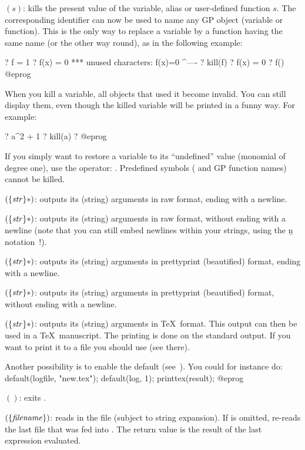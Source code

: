 $(s)$:\label{se:kill} kills the present value of the
variable, alias or user-defined function $s$. The corresponding identifier
can now be used to name any GP object (variable or function). This is the
only way to replace a variable by a function having the same name (or the
other way round), as in the following example:

\bprog
? f = 1
? f(x) = 0
  ***   unused characters: f(x)=0
                            ^----
? kill(f)
? f(x) = 0
? f()
@eprog

  When you kill a variable, all objects that used it become invalid. You
can still display them, even though the killed variable will be printed in a
funny way. For example:

\bprog
? a^2 + 1
? kill(a)
? %
@eprog

If you simply want to restore a variable to its ``undefined'' value
(monomial of degree one), use the  operator: .
Predefined symbols ( and GP function names) cannot be killed.

$(\{\hbox{\it str\/}\}*)$: outputs its (string) arguments in raw
format, ending with a newline.

$(\{\hbox{\it str\/}\}*)$: outputs its (string) arguments in raw
format, without ending with a newline (note that you can still embed newlines
within your strings, using the \b{n} notation~!).

$(\{\hbox{\it str\/}\}*)$: outputs its (string) arguments in
prettyprint (beautified) format, ending with a newline.

$(\{\hbox{\it str\/}\}*)$: outputs its (string) arguments in
prettyprint (beautified) format, without ending with a newline.

$(\{\hbox{\it str\/}\}*)$: outputs its (string) arguments in
\TeX\ format. This output can then be used in a \TeX\ manuscript.
The printing is done on the standard output. If you want to print it to a
file you should use  (see there).

Another possibility is to enable the  default
(see~).
You could for instance do:
%
\bprog
default(logfile, "new.tex");
default(log, 1);
printtex(result);
@eprog

$()$: exits .\label{se:quit}

$(\{\hbox{\it filename\/}\})$: reads in the file
 (subject to string expansion). If  is
omitted, re-reads the last file that was fed into . The return
value is the result of the last expression evaluated.\label{se:read}

